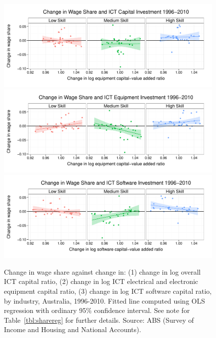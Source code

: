 \begin{figure}
  \centering
  \includegraphics[width=\textwidth]{../figure/wage_share_ict.pdf}
  \includegraphics[width=\textwidth]{../figure/wage_share_equipment_skill.pdf}
  \includegraphics[width=\textwidth]{../figure/wage_share_software_skill.pdf}
  \caption{Change in wage share against change in: (1) change in log overall ICT capital ratio, (2) change in log ICT electrical and electronic equipment capital ratio, (3) change in log ICT software capital ratio, by industry, Australia, 1996-2010.
    Fitted line computed using OLS regression with ordinary 95\% confidence interval. See note for Table~\ref{tbl:sharereg} for further details. Source: ABS (Survey of Income and Housing and National Accounts).
  }
  \label{fig:equip}
\end{figure}

